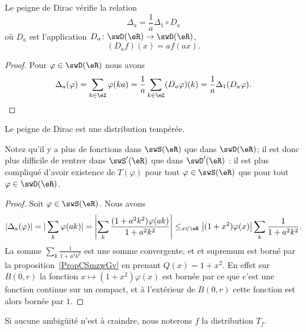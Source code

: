 \begin{lemma}
    Le peigne de Dirac vérifie la relation
    \begin{equation}
        \Delta_a=\frac{1}{ a }\Delta_1\circ D_a
    \end{equation}
    où \( D_a\) est l'application \( D_a\colon \swD(\eR)\to \swD(\eR)\),
    \begin{equation}
        (D_af)(x)=af(ax).
    \end{equation}
\end{lemma}

\begin{proof}
    Pour \( \varphi\in\swD(\eR)\) nous avons
    \begin{equation}
        \Delta_a(\varphi)=\sum_{k\in \eZ}\varphi(ka)=\frac{1}{ a }\sum_{k\in \eZ}(D_a\varphi)(k)=\frac{1}{ a }\Delta_1(D_a\varphi).
    \end{equation}
\end{proof}

\begin{proposition}
    Le peigne de Dirac est une distribution tempérée.
\end{proposition}

Notez qu'il y a plus de fonctions dans \( \swS(\eR)\) que dans \( \swD(\eR)\); il est donc plus difficile de rentrer dans \( \swS'(\eR)\) que dans \( \swD'(\eR)\) : il est plus compliqué d'avoir existence de \( T(\varphi)\) pour tout \( \varphi\in\swS(\eR)\) que pour tout \( \varphi\in\swD(\eR)\).

\begin{proof}
    Soit \( \varphi\in\swS(\eR)\). Nous avons
    \begin{equation}
        |\Delta_a(\varphi)|=| \sum_k\varphi(ak) |=\left| \sum_k\frac{ (1+a^2k^2)\varphi(ak) }{ 1+a^2k^2 } \right| \leq_{x\in \eR}\big| (1+x^2)\varphi(x) \big|\sum_k\frac{1}{ 1+a^2k^2 }.
    \end{equation}
    La somme \( \sum_k\frac{1}{ 1+a^2k^2 }\) est une somme convergente, et et supremum est borné par la proposition~\ref{PropCSmzwGv} en prenant \( Q(x)=1+x^2\). En effet sur \( \overline{ B(0,r) }\) la fonction \( x\mapsto (1+x^2)\varphi(x)\) est bornée par ce que c'est une fonction continue sur un compact, et à l'extérieur de \( B(0,r)\) cette fonction est alors bornée par \( 1\).
\end{proof}

Si aucune ambigüité n'est à craindre, nous noterons \( f\) la distribution \( T_f\).

